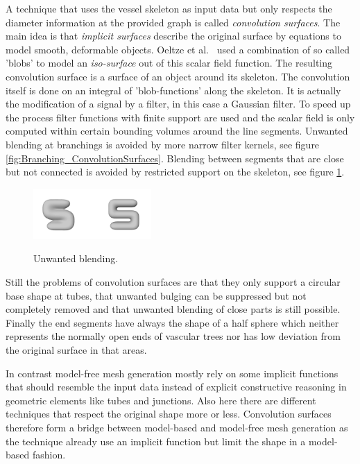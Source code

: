 A technique that uses the vessel skeleton as input data but only respects the diameter information at the provided graph is called \emph{convolution surfaces}. The main idea is that \emph{implicit surfaces} describe the original surface by equations to model smooth, deformable objects. Oeltze et al.~\cite{oeltze2005visualization} used a combination of so called 'blobs' to model an \emph{iso-surface} out of this scalar field function.
The resulting convolution surface is a surface of an object around its skeleton. The convolution itself is done on an integral of 'blob-functions' along the skeleton. It is actually the modification of a signal by a filter, in this case a Gaussian filter. To speed up the process filter functions with finite support are used and the scalar field is only computed within certain bounding volumes around the line segments. Unwanted blending at branchings is avoided by more narrow filter kernels, see figure \ref{fig:Branching_ConvolutionSurfaces}. Blending between segments that are close but not connected is avoided by restricted support on the skeleton, see figure \ref{fig:Blending_ConvolutionSurfaces}.

\begin{figure}[h]
	\centering
	\includegraphics[width=0.4\textwidth]{./Images/Blending_ConvolutionSurfaces.png} \\
	\caption{Unwanted blending.}
	\cite{oeltze2005visualization}
	\label{fig:Blending_ConvolutionSurfaces}
\end{figure}

Still the problems of convolution surfaces are that they only support a circular base shape at tubes, that unwanted bulging can be suppressed but not completely removed and that unwanted blending of close parts is still possible. Finally the end segments have always the shape of a half sphere which neither represents the normally open ends of vascular trees nor has low deviation from the original surface in that areas.

In contrast model-free mesh generation mostly rely on some implicit functions that should resemble the input data instead of explicit constructive reasoning in geometric elements like tubes and junctions. Also here there are different techniques that respect the original shape more or less. Convolution surfaces therefore form a bridge between model-based and model-free mesh generation as the technique already use an implicit function but limit the shape in a model-based fashion.

